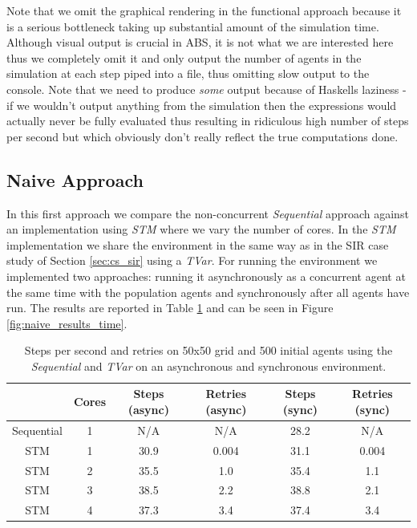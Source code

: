 Note that we omit the graphical rendering in the functional approach because it is a serious bottleneck taking up substantial amount of the simulation time. Although visual output is crucial in ABS, it is not what we are interested here thus we completely omit it and only output the number of agents in the simulation at each step piped into a file, thus omitting slow output to the console. Note that we need to produce \textit{some} output because of Haskells laziness - if we wouldn't output anything from the simulation then the expressions would actually never be fully evaluated thus resulting in ridiculous high number of steps per second but which obviously don't really reflect the true computations done.

\subsection{Naive Approach}
In this first approach we compare the non-concurrent \textit{Sequential} approach against an implementation using \textit{STM} where we vary the number of cores. In the \textit{STM} implementation we share the environment in the same way as in the SIR case study of Section \ref{sec:cs_sir} using a \textit{TVar}. For running the environment we implemented two approaches: running it asynchronously as a concurrent agent at the same time with the population agents and synchronously after all agents have run. The results are reported in Table \ref{tab:naive_results_time} and can be seen in Figure \ref{fig:naive_results_time}. 

\begin{table}
	\centering
  	\begin{tabular}{ c || c | c | c || c | c }
                   & Cores & Steps (async) & Retries (async) & Steps (sync) & Retries (sync) \\ \hline \hline 
    	Sequential & 1     & N/A           & N/A 			 & 28.2         & N/A            \\ \hline \hline    
   		STM        & 1     & 30.9          & 0.004 			 & 31.1 	    & 0.004          \\ \hline
   		STM        & 2     & 35.5          & 1.0 		     & 35.4         & 1.1 			 \\ \hline
   		STM        & 3     & 38.5          & 2.2 			 & 38.8 	    & 2.1 			 \\ \hline
   		STM        & 4     & 37.3          & 3.4             & 37.4         & 3.4
   	\end{tabular}
  	
  	\caption{Steps per second and retries on 50x50 grid and 500 initial agents using the \textit{Sequential} and \textit{TVar} on an asynchronous and synchronous environment.}
	\label{tab:naive_results_time}
\end{table}

